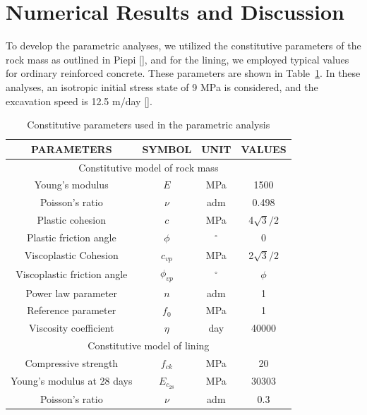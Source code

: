 \documentclass[a4paper,fleqn]{cas-sc}
\begin{document}
\section{Numerical Results and Discussion}\label{}

To develop the parametric analyses, we utilized the constitutive parameters of the rock mass as outlined in Piepi [], and for the lining, we employed typical values for ordinary reinforced concrete. These parameters are shown in Table~\ref{table2}. In these analyses, an isotropic initial stress state of 9 MPa is considered, and the excavation speed is 12.5 m/day [].
\begin{table}
	\caption{Constitutive parameters used in the parametric analysis}
	\label{table2}
	\centering
	\renewcommand{\arraystretch}{1.25}
	\begin{tabular}{c c c c}
		\hline
		\multicolumn{1}{c}{PARAMETERS} &
		\multicolumn{1}{c}{SYMBOL} &
		\multicolumn{1}{c}{UNIT} &
		\multicolumn{1}{c}{VALUES} \\
		\hline
		\multicolumn{4}{c}{Constitutive model of rock mass} \\
		\hline
		Young's modulus & $E$ & MPa & 1500 \\
		Poisson's ratio & $\nu$ & adm & 0.498 \\
		Plastic cohesion & $c$ & MPa & 4$\sqrt{3}/2$ \\
		Plastic friction angle & $\phi$ & $^{\circ}$ & 0 \\
		Viscoplastic Cohesion & $c_{vp}$ & MPa & 2$\sqrt{3}/2$ \\
		Viscoplastic friction angle & $\phi_{vp}$ & $^{\circ}$ & $\phi$ \\
		Power law parameter & $n$ & adm & 1 \\
		Reference parameter & $f_0$ & MPa & 1 \\
		Viscosity coefficient & $\eta$ & day & 40000 \\
		\hline
		\multicolumn{4}{c}{Constitutive model of lining} \\
		\hline
		
		Compressive strength & $f_{ck}$ & MPa & 20 \\
		Young's modulus at 28 days & $E_{c_{28}}$ & MPa & $30303$ \\
		Poisson's ratio & $\nu$ & adm & 0.3 \\
		

\end{tabular}
\end{table}
\end{document}
